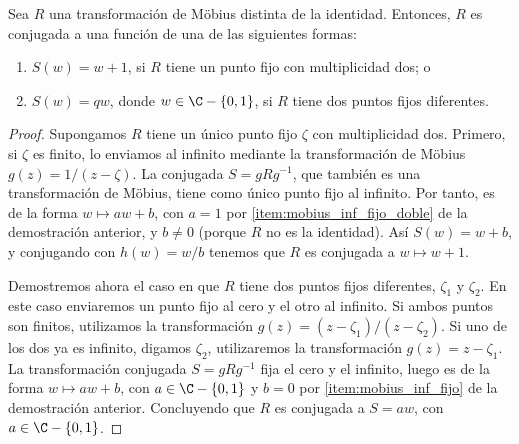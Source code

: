 \begin{proposicion}
  Sea $R$ una transformación de Möbius distinta de la identidad. Entonces, $R$
  es conjugada a una función de una de las siguientes formas:
  \begin{enumerate}[label=(\arabic*)]
    \item $S(w) = w + 1$, si $R$ tiene un punto fijo con multiplicidad dos; o
    \item $S(w) = qw$, donde $w \in \C - \{0, 1\}$, si $R$ tiene dos puntos
          fijos diferentes.
  \end{enumerate}
\end{proposicion}
\begin{proof}
  Supongamos $R$ tiene un único punto fijo $\zeta$ con multiplicidad dos.
  Primero, si $\zeta$ es finito, lo enviamos al infinito mediante la
  transformación de Möbius $g(z) = 1/(z - \zeta)$. La conjugada $S = g R
  g^{-1}$, que también es una transformación de Möbius, tiene como único punto
  fijo al infinito. Por tanto, es de la forma $w \mapsto aw + b$, con $a = 1$
  por \ref{item:mobius_inf_fijo_doble} de la demostración anterior, y $b \neq
  0$ (porque $R$ no es la identidad). Así $S(w) = w + b$, y conjugando con
  $h(w) = w/b$ tenemos que $R$ es conjugada a $w \mapsto w + 1$.

  Demostremos ahora el caso en que $R$ tiene dos puntos fijos diferentes,
  $\zeta_1$ y $\zeta_2$. En este caso enviaremos un punto fijo al cero y el
  otro al infinito. Si ambos puntos son finitos, utilizamos la transformación
  $g(z) = (z - \zeta_1)/(z - \zeta_2)$. Si uno de los dos ya es infinito,
  digamos $\zeta_2$, utilizaremos la transformación $g(z) = z - \zeta_1$. La
  transformación conjugada $S = g R g^{-1}$ fija el cero y el infinito, luego
  es de la forma $w \mapsto aw + b$, con $a \in \C - \{0, 1\}$ y $b = 0$ por
  \ref{item:mobius_inf_fijo} de la demostración anterior. Concluyendo que $R$ es
  conjugada a $S = aw$, con $a \in \C - \{0, 1\}$.
\end{proof}

